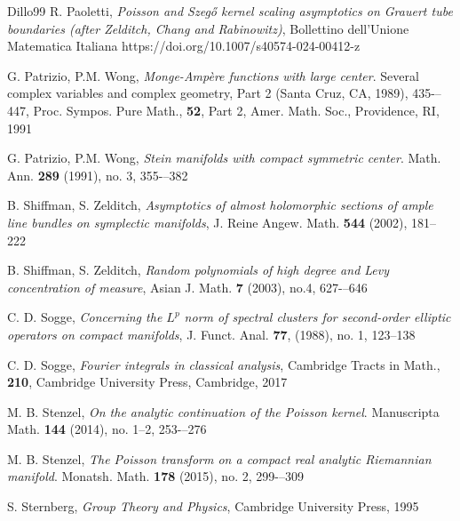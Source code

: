\documentclass[12pt,a4paper]{article}
\theoremstyle{plain}
\theoremstyle{definition}
\begin{document}
\begin{thebibliography}{Dillo99}
R. Paoletti, {\em 
Poisson and Szeg\H{o} kernel scaling asymptotics on Grauert
tube boundaries (after Zelditch, Chang and Rabinowitz)},
Bollettino dell'Unione Matematica Italiana
https://doi.org/10.1007/s40574-024-00412-z

G. Patrizio, P.M. Wong, {\em 
Monge-Amp\`{e}re functions with large center}. Several complex variables and complex geometry, Part 2 (Santa Cruz, CA, 1989), 435-–447,
Proc. Sympos. Pure Math., \textbf{52}, Part 2, Amer. Math. Soc., 
Providence, RI, 1991

G. Patrizio, P.M. Wong, {\em Stein manifolds with compact symmetric center}. Math. Ann. \textbf{289} (1991), no. 3, 355-–382

%


 B. Shiffman, S. Zelditch, {\em Asymptotics of almost
holomorphic sections of ample line bundles on symplectic
manifolds}, J. Reine Angew. Math. {\bf 544} (2002), 181--222
 
 B. Shiffman, S. Zelditch, {\em 
Random polynomials of high degree and Levy concentration of measure},
Asian J. Math.
\textbf{7}
(2003), no.4, 627-–646



C. D. Sogge, {\em  Concerning the  $L^p$  norm of spectral clusters for second-order elliptic operators on compact manifolds},
J. Funct. Anal. \textbf{77},
(1988), no. 1, 123–138


C. D. Sogge, {\em  Fourier integrals in classical analysis},
Cambridge Tracts in Math., \textbf{210},
Cambridge University Press, Cambridge, 2017

M. B. Stenzel, {\em
On the analytic continuation of the Poisson kernel}. 
Manuscripta Math. \textbf{144} (2014), no. 1--2, 253-–276

M. B. Stenzel, {\em
The Poisson transform on a compact real analytic Riemannian manifold}. %
Monatsh. Math. \textbf{178} (2015), no. 2, 299-–309

 S. Sternberg, {\em Group Theory and Physics}, Cambridge University Press, 1995


\end{thebibliography}
\end{document}

